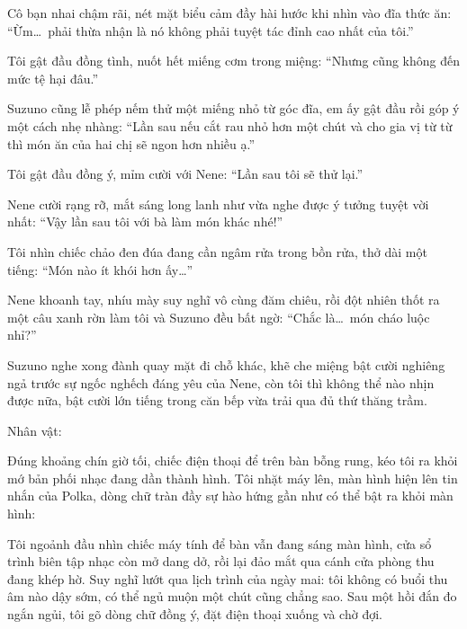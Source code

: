 \documentclass[../main.tex]{subfiles}
\begin{document}
Cô bạn nhai chậm rãi, nét mặt biểu cảm đầy hài hước khi nhìn vào đĩa thức ăn: ``Ừm\dots\ phải thừa nhận là nó không phải tuyệt tác đỉnh cao nhất của tôi.''

Tôi gật đầu đồng tình, nuốt hết miếng cơm trong miệng: ``Nhưng cũng không đến mức tệ hại đâu.''

Suzuno cũng lễ phép nếm thử một miếng nhỏ từ góc đĩa, em ấy gật đầu rồi góp ý một cách nhẹ nhàng: ``Lần sau nếu cắt rau nhỏ hơn một chút và cho gia vị từ từ thì món ăn của hai chị sẽ ngon hơn nhiều ạ.''

Tôi gật đầu đồng ý, mỉm cười với Nene: ``Lần sau tôi sẽ thử lại.''

Nene cười rạng rỡ, mắt sáng long lanh như vừa nghe được ý tưởng tuyệt vời nhất: ``Vậy lần sau tôi với bà làm món khác nhé!''

Tôi nhìn chiếc chảo đen đúa đang cần ngâm rửa trong bồn rửa, thở dài một tiếng: ``Món nào ít khói hơn ấy\dots''

Nene khoanh tay, nhíu mày suy nghĩ vô cùng đăm chiêu, rồi đột nhiên thốt ra một câu xanh rờn làm tôi và Suzuno đều bất ngờ: ``Chắc là\dots\ món cháo luộc nhỉ?''

Suzuno nghe xong đành quay mặt đi chỗ khác, khẽ che miệng bật cười nghiêng ngả trước sự ngốc nghếch đáng yêu của Nene, còn tôi thì không thể nào nhịn được nữa, bật cười lớn tiếng trong căn bếp vừa trải qua đủ thứ thăng trầm.

\newpage

\begin{center}
    {\caviar\fontsize{12pt}{12pt}\selectfont Nhân vật:    }
\end{center}

Đúng khoảng chín giờ tối, chiếc điện thoại để trên bàn bỗng rung, kéo tôi ra khỏi mớ bản phối nhạc đang dần thành hình. Tôi nhặt máy lên, màn hình hiện lên tin nhắn của Polka, dòng chữ tràn đầy sự hào hứng gần như có thể bật ra khỏi màn hình:


Tôi ngoảnh đầu nhìn chiếc máy tính để bàn vẫn đang sáng màn hình, cửa sổ trình biên tập nhạc còn mở dang dở, rồi lại đảo mắt qua cánh cửa phòng thu đang khép hờ. Suy nghĩ lướt qua lịch trình của ngày mai: tôi không có buổi thu âm nào dậy sớm, có thể ngủ muộn một chút cũng chẳng sao. Sau một hồi đắn đo ngắn ngủi, tôi gõ dòng chữ đồng ý, đặt điện thoại xuống và chờ đợi.
\end{document}
